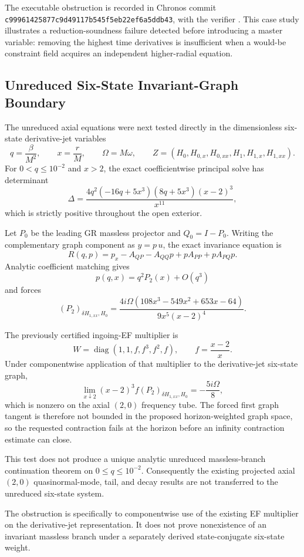 The executable obstruction is recorded in Chronos commit
\texttt{c99961425877c9d49117b545f5eb22ef6a5ddb43}, with the verifier
.  This case
study illustrates a reduction-soundness failure detected before introducing a
master variable: removing the highest time derivatives is insufficient when a
would-be constraint field acquires an independent higher-radial equation.


\subsection{Unreduced Six-State Invariant-Graph Boundary}

The unreduced axial equations were next tested directly in the dimensionless
six-state derivative-jet variables
\[
q=\frac{\beta}{M^2},
\qquad
x=\frac rM,
\qquad
\Omega=M\omega,
\qquad
Z=(H_0,H_{0,x},H_{0,xx},H_1,H_{1,x},H_{1,xx}).
\]
For \(0<q\le10^{-2}\) and \(x>2\), the exact coefficientwise principal solve
has determinant
\[
\Delta
=
\frac{
4q^2(-16q+5x^3)(8q+5x^3){(x-2)}^3
}{x^{11}},
\]
which is strictly positive throughout the open exterior.

Let \(P_0\) be the leading GR massless projector and
\(Q_0=I-P_0\).  Writing the complementary graph component as \(y=p\,u\),
the exact invariance equation is
\[
R(q,p)
=
p_x-A_{QP}-A_{QQ}p+pA_{PP}+pA_{PQ}p.
\]
Analytic coefficient matching gives
\[
p(q,x)=q^2P_2(x)+O(q^3)
\]
and forces
\[
{(P_2)}_{\delta H_{1,xx},H_0}
=
\frac{
4i\Omega(108x^3-549x^2+653x-64)
}{
9x^5{(x-2)}^4
}.
\]

The previously certified ingoing-EF multiplier is
\[
W=\operatorname{diag}(1,1,f,f^3,f^2,f),
\qquad
f=\frac{x-2}{x}.
\]
Under componentwise application of that multiplier to the derivative-jet
six-state graph,
\[
\lim_{x\downarrow2}
{(x-2)}^3 f
{(P_2)}_{\delta H_{1,xx},H_0}
=
-\frac{5i\Omega}{8},
\]
which is nonzero on the axial \((2,0)\) frequency tube.  The forced first graph
tangent is therefore not bounded in the proposed horizon-weighted graph
space, so the requested contraction fails at the horizon before an infinity
contraction estimate can close.

\begin{remark}
This test does not produce a unique analytic unreduced massless-branch
continuation theorem on \(0\le q\le10^{-2}\).  Consequently the existing
projected axial \((2,0)\) quasinormal-mode, tail, and decay results are not
transferred to the unreduced six-state system.

The obstruction is specifically to componentwise use of the existing EF
multiplier on the derivative-jet representation.  It does not prove
nonexistence of an invariant massless branch under a separately derived
state-conjugate six-state weight.
\end{remark}

